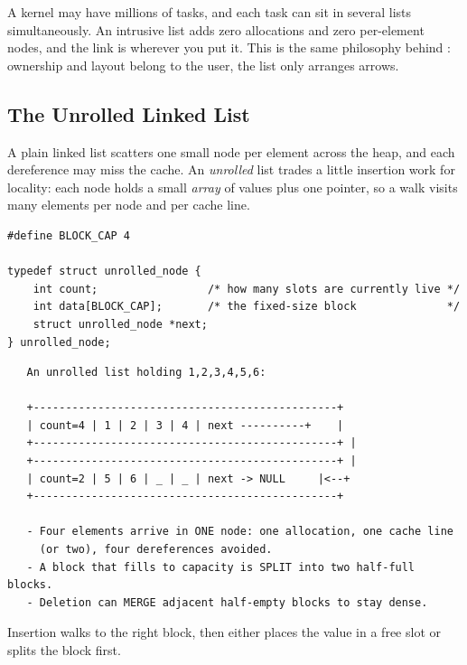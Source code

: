 \begin{insight}
A kernel may have millions of tasks, and each task can sit in several
lists simultaneously. An intrusive list adds zero allocations and zero
per-element nodes, and the link is wherever you put it. This is the
same philosophy behind : ownership and layout
belong to the user, the list only arranges arrows.
\end{insight}

\subsection{The Unrolled Linked List}

A plain linked list scatters one small node per element across the
heap, and each  dereference may miss the cache. An
\emph{unrolled} list trades a little insertion work for locality: each
node holds a small \emph{array} of values plus one  pointer,
so a walk visits many elements per node and per cache line.

\begin{lstlisting}[caption={The unrolled node: a block plus one arrow.}]
#define BLOCK_CAP 4

typedef struct unrolled_node {
    int count;                 /* how many slots are currently live */
    int data[BLOCK_CAP];       /* the fixed-size block              */
    struct unrolled_node *next;
} unrolled_node;
\end{lstlisting}

\begin{verbatim}
   An unrolled list holding 1,2,3,4,5,6:

   +-----------------------------------------------+
   | count=4 | 1 | 2 | 3 | 4 | next ----------+    |
   +-----------------------------------------------+ |
   +-----------------------------------------------+ |
   | count=2 | 5 | 6 | _ | _ | next -> NULL     |<--+
   +-----------------------------------------------+

   - Four elements arrive in ONE node: one allocation, one cache line
     (or two), four dereferences avoided.
   - A block that fills to capacity is SPLIT into two half-full blocks.
   - Deletion can MERGE adjacent half-empty blocks to stay dense.
\end{verbatim}

Insertion walks to the right block, then either places the value in a
free slot or splits the block first.

